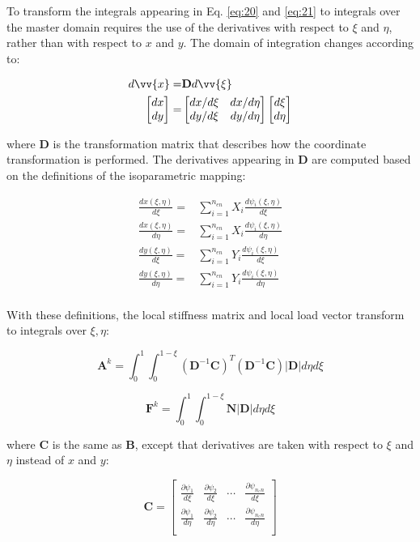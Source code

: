 \documentclass[10pt]{article}
\newcommand{\beq}{\begin{equation}}
\newcommand{\eeq}{\end{equation}}
\newcommand{\beqa}{\begin{equation}\begin{aligned}}
\newcommand{\eeqa}{\end{aligned}\end{equation}}
\begin{document}
To transform the integrals appearing in Eq. \eqref{eq:20} and \eqref{eq:21} to integrals over the master domain requires the use of the derivatives with respect to \(\xi\) and \(\eta\), rather than with respect to \(x\) and \(y\). The domain of integration changes according to:

\beqa
d\vv{x}=&\textbf{D}d\vv{\xi}\\
\begin{bmatrix}dx\\dy\end{bmatrix}=&
\begin{bmatrix}dx/d\xi & dx/d\eta\\ dy/d\xi & dy/d\eta\end{bmatrix}
\begin{bmatrix}d\xi\\d\eta\end{bmatrix}
\eeqa

where \textbf{D} is the transformation matrix that describes how the coordinate transformation is performed. The derivatives appearing in \textbf{D} are computed based on the definitions of the isoparametric mapping:

\beqa
\frac{dx(\xi,\eta)}{d\xi}=&\sum_{i=1}^{n_{en}}X_i\frac{d\psi_i(\xi,\eta)}{d\xi}\\
\frac{dx(\xi,\eta)}{d\eta}=&\sum_{i=1}^{n_{en}}X_i\frac{d\psi_i(\xi,\eta)}{d\eta}\\
\frac{dy(\xi,\eta)}{d\xi}=&\sum_{i=1}^{n_{en}}Y_i\frac{d\psi_i(\xi,\eta)}{d\xi}\\
\frac{dy(\xi,\eta)}{d\eta}=&\sum_{i=1}^{n_{en}}Y_i\frac{d\psi_i(\xi,\eta)}{d\eta}\\
\eeqa

With these definitions, the local stiffness matrix and local load vector transform to integrals over \(\xi, \eta\):

\beq
\label{eq:20}
\textbf{A}^k=\int_{0}^{1} \int_{0}^{1-\xi}(\textbf{D}^{-1}\textbf{C})^T(\textbf{D}^{-1}\textbf{C})|\textbf{D}| d\eta d\xi
\eeq

\beq
\label{eq:21}
\textbf{F}^k=\int_{0}^{1} \int_{0}^{1-\xi}\textbf{N}|\textbf{D}| d\eta d\xi
\eeq

where \textbf{C} is the same as \textbf{B}, except that derivatives are taken with respect to \(\xi\) and \(\eta\) instead of \(x\) and \(y\):

\beq
\textbf{C}=\begin{bmatrix}
\frac{\partial\psi_1}{d\xi} & \frac{\partial\psi_2}{d\xi} & \cdots & \frac{\partial\psi_{n_en}}{d\xi}\\
\frac{\partial\psi_1}{d\eta} & \frac{\partial\psi_2}{d\eta} & \cdots & \frac{\partial\psi_{n_en}}{d\eta}\\
\end{bmatrix}
\eeq
\end{document}
